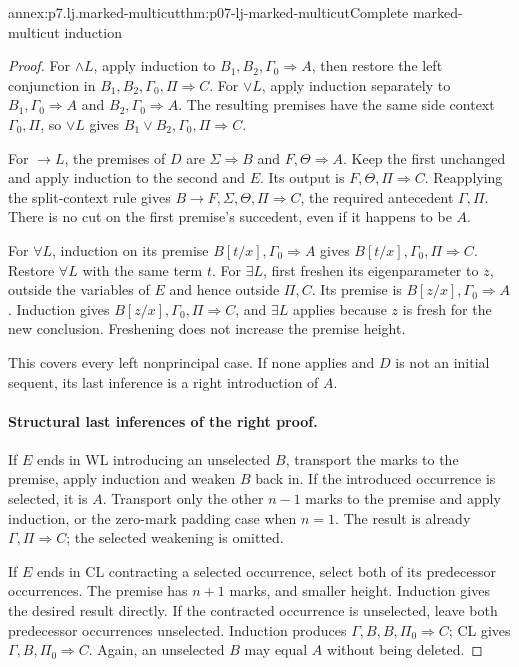 \begin{annexitem}{annex:p7.lj.marked-multicut}{thm:p07-lj-marked-multicut}{Complete marked-multicut induction}
\begin{proof}
For \(\land L\), apply induction to
\(B_1,B_2,\Gamma_0\Rightarrow A\), then restore the left
conjunction in \(B_1,B_2,\Gamma_0,\Pi\Rightarrow C\).
For \(\lor L\), apply induction separately to
\(B_1,\Gamma_0\Rightarrow A\) and
\(B_2,\Gamma_0\Rightarrow A\).  The resulting premises have the
same side context \(\Gamma_0,\Pi\), so \(\lor L\) gives
\(B_1\lor B_2,\Gamma_0,\Pi\Rightarrow C\).

For \(\to L\), the premises of \(D\) are
\(\Sigma\Rightarrow B\) and \(F,\Theta\Rightarrow A\).
Keep the first unchanged and apply induction to the second and \(E\).
Its output is \(F,\Theta,\Pi\Rightarrow C\).  Reapplying the
split-context rule gives
\(B\to F,\Sigma,\Theta,\Pi\Rightarrow C\), the required
antecedent \(\Gamma,\Pi\).  There is no cut on the first premise's
succedent, even if it happens to be \(A\).

For \(\forall L\), induction on its premise
\(B[t/x],\Gamma_0\Rightarrow A\) gives
\(B[t/x],\Gamma_0,\Pi\Rightarrow C\).  Restore \(\forall L\)
with the same term \(t\).  For \(\exists L\), first freshen its
eigenparameter to \(z\), outside the variables of \(E\) and hence
outside \(\Pi,C\).  Its premise is
\(B[z/x],\Gamma_0\Rightarrow A\).  Induction gives
\(B[z/x],\Gamma_0,\Pi\Rightarrow C\), and \(\exists L\)
applies because \(z\) is fresh for the new conclusion.  Freshening
does not increase the premise height.

This covers every left nonprincipal case.  If none applies and \(D\)
is not an initial sequent, its last inference is a right introduction
of \(A\).

\paragraph{Structural last inferences of the right proof.}
If \(E\) ends in WL introducing an unselected \(B\), transport
the marks to the premise, apply induction and weaken \(B\) back in.
If the introduced occurrence is selected, it is \(A\).  Transport
only the other \(n-1\) marks to the premise and apply induction, or
the zero-mark padding case when \(n=1\).  The result is already
\(\Gamma,\Pi\Rightarrow C\); the selected weakening is omitted.

If \(E\) ends in CL contracting a selected occurrence, select both
of its predecessor occurrences.  The premise has \(n+1\) marks,
and smaller height.  Induction gives the desired result directly.
If the contracted occurrence is unselected, leave both predecessor
occurrences unselected.  Induction produces
\(\Gamma,B,B,\Pi_0\Rightarrow C\); CL gives
\(\Gamma,B,\Pi_0\Rightarrow C\).  Again, an unselected \(B\)
may equal \(A\) without being deleted.


\end{proof}
\end{annexitem}

